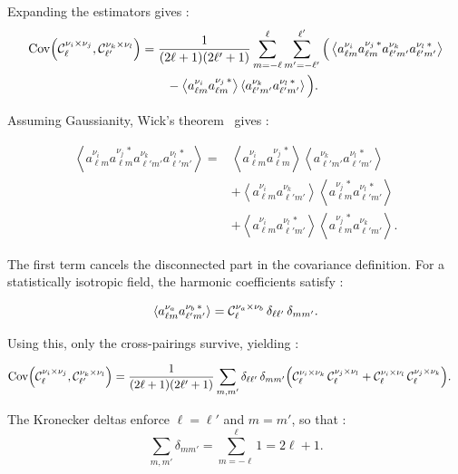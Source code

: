 \documentclass[../../thesis.tex]{subfiles}
\begin{document}
Expanding the estimators gives :
\begin{align}
    \mathrm{Cov}\!\left(\mathcal{C}_{\ell}^{\nu_{i} \times \nu_{j}}, \mathcal{C}_{\ell'}^{\nu_{k} \times \nu_{l}}\right)
    &= \frac{1}{(2\ell+1)(2\ell'+1)} \sum_{m=-\ell}^{\ell} \sum_{m'=-\ell'}^{\ell'} \Big( \left\langle a^{\nu_i}_{\ell m} a^{\nu_j\,*}_{\ell m} a^{\nu_k}_{\ell' m'} a^{\nu_l\,*}_{\ell' m'} \right\rangle \nonumber\\ 
    &\qquad - \left\langle a^{\nu_i}_{\ell m} a^{\nu_j\,*}_{\ell m} \right\rangle \left\langle a^{\nu_k}_{\ell' m'} a^{\nu_l\,*}_{\ell' m'} \right\rangle \Big).
\end{align}

Assuming Gaussianity, Wick’s theorem~\cite{wick1950} gives :

\begin{align}
    \left\langle a^{\nu_i}_{\ell m} a^{\nu_j\,*}_{\ell m} a^{\nu_k}_{\ell' m'} a^{\nu_l\,*}_{\ell' m'} \right\rangle = 
    &\left\langle a^{\nu_i}_{\ell m} a^{\nu_j\,*}_{\ell m} \right\rangle \left\langle a^{\nu_k}_{\ell' m'} a^{\nu_l\,*}_{\ell' m'} \right\rangle \nonumber\\ &+ \left\langle a^{\nu_i}_{\ell m} a^{\nu_k}_{\ell' m'} \right\rangle \left\langle a^{\nu_j\,*}_{\ell m} a^{\nu_l\,*}_{\ell' m'} \right\rangle \nonumber\\ 
    &+ \left\langle a^{\nu_i}_{\ell m} a^{\nu_l\,*}_{\ell' m'} \right\rangle \left\langle a^{\nu_j\,*}_{\ell m} a^{\nu_k}_{\ell' m'} \right\rangle.
\end{align}

The first term cancels the disconnected part in the covariance definition. For a statistically isotropic field, the harmonic coefficients satisfy :

\begin{equation}
    \left\langle a^{\nu_a}_{\ell m} a^{\nu_b\,*}_{\ell' m'} \right\rangle
    = \mathcal{C}_{\ell}^{\nu_{a} \times \nu_{b}}\,\delta_{\ell\ell'}\,\delta_{mm'}.
\end{equation}

Using this, only the cross-pairings survive, yielding :

\begin{align}
    \mathrm{Cov}\!\left(\mathcal{C}_{\ell}^{\nu_{i} \times \nu_{j}}, \mathcal{C}_{\ell'}^{\nu_{k} \times \nu_{l}}\right)
    &= \frac{1}{(2\ell+1)(2\ell'+1)} \sum_{m,m'} \delta_{\ell\ell'}\,\delta_{mm'} \Big( \mathcal{C}_{\ell}^{\nu_{i} \times \nu_{k}}\,\mathcal{C}_{\ell}^{\nu_{j} \times \nu_{l}} + \mathcal{C}_{\ell}^{\nu_{i} \times \nu_{l}}\,\mathcal{C}_{\ell}^{\nu_{j} \times \nu_{k}} \Big).
\end{align}

The Kronecker deltas enforce $\ell=\ell'$ and $m=m'$, so that :
\begin{equation}
    \sum_{m,m'} \delta_{mm'} = \sum_{m=-\ell}^{\ell} 1 = 2\ell+1.
\end{equation}
\end{document}
